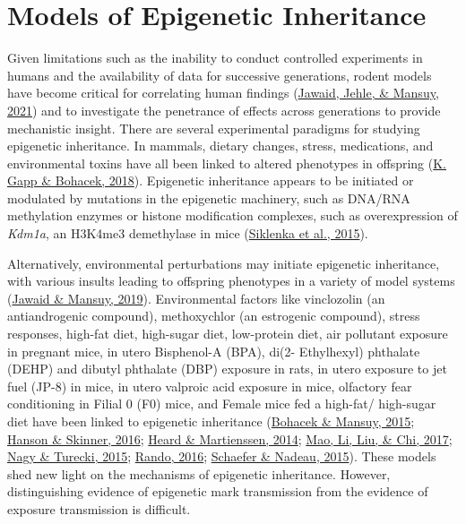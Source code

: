 \documentclass[12pt,twoside]{reedthesis}
\begin{document}
\hypertarget{models-of-epigenetic-inheritance}{%
\section*{Models of Epigenetic Inheritance}\label{models-of-epigenetic-inheritance}}

Given limitations such as the inability to conduct controlled
experiments in humans and the availability of data for successive
generations, rodent models have become critical for correlating human
findings (\protect\hyperlink{ref-jawaid2021}{Jawaid, Jehle, \& Mansuy, 2021}) and to investigate the penetrance of effects
across generations to provide mechanistic insight. There are several
experimental paradigms for studying epigenetic inheritance. In mammals,
dietary changes, stress, medications, and environmental toxins have all
been linked to altered phenotypes in offspring (\protect\hyperlink{ref-gapp2018}{K. Gapp \& Bohacek, 2018}). Epigenetic
inheritance appears to be initiated or modulated by mutations in the
epigenetic machinery, such as DNA/RNA methylation enzymes or histone
modification complexes, such as overexpression of \emph{Kdm1a}, an H3K4me3
demethylase in mice (\protect\hyperlink{ref-siklenka2015}{Siklenka et al., 2015}).

Alternatively, environmental perturbations may initiate epigenetic
inheritance, with various insults leading to offspring phenotypes in a
variety of model systems (\protect\hyperlink{ref-jawaid2019}{Jawaid \& Mansuy, 2019}). Environmental factors like
vinclozolin (an antiandrogenic compound), methoxychlor (an estrogenic
compound), stress responses, high-fat diet, high-sugar diet, low-protein
diet, air pollutant exposure in pregnant mice, in utero Bisphenol-A (BPA),
di(2- Ethylhexyl) phthalate (DEHP) and dibutyl phthalate (DBP) exposure
in rats, in utero exposure to jet fuel (JP-8) in mice, in utero valproic
acid exposure in mice, olfactory fear conditioning in Filial 0 (F0) mice, and
Female mice fed a high-fat/ high-sugar diet have been linked to
epigenetic inheritance (\protect\hyperlink{ref-bohacek2015}{Bohacek \& Mansuy, 2015}; \protect\hyperlink{ref-hanson2016}{Hanson \& Skinner, 2016}; \protect\hyperlink{ref-heard2014}{Heard \& Martienssen, 2014}; \protect\hyperlink{ref-mao2017}{Mao, Li, Liu, \& Chi, 2017}; \protect\hyperlink{ref-nagy2015}{Nagy \& Turecki, 2015}; \protect\hyperlink{ref-rando2016}{Rando, 2016}; \protect\hyperlink{ref-schaefer2015}{Schaefer \& Nadeau, 2015}). These models shed new light on
the mechanisms of epigenetic inheritance. However, distinguishing
evidence of epigenetic mark transmission from the evidence of exposure
transmission is difficult.
\end{document}
